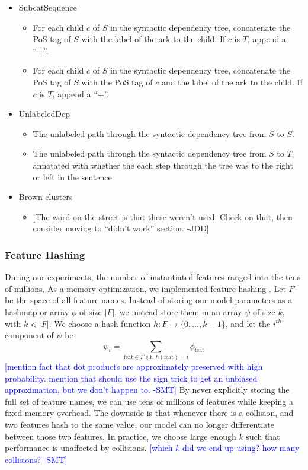 \documentclass[11pt]{article}
\newcommand{\sam}[1]{\textcolor{blue}{[#1 -SMT]}}
\newcommand{\jdcomment}[1]{\textcolor{NavyBlue}{[#1 -JDD]}}
\begin{document}
\begin{itemize}
\item SubcatSequence
\begin{itemize}
\item For each child $c$ of $S$ in the syntactic dependency tree, concatenate the PoS tag of $S$ with the label of the ark to the child. If $c$ is $T$, append a ``+''.
\item For each child $c$ of $S$ in the syntactic dependency tree, concatenate the PoS tag of $S$ with the PoS tag of $c$ and the label of the ark to the child. If $c$ is $T$, append a ``+''.
\end{itemize}
\item UnlabeledDep
\begin{itemize}
\item The unlabeled path through the syntactic dependency tree from $S$ to $S$. 
\item The unlabeled path through the syntactic dependency tree from $S$ to $T$, annotated with whether the each step through the tree was to the right or left in the sentence.
\end{itemize}
\item Brown clusters
\begin{itemize}
\item \jdcomment{The word on the street is that these weren't used. Check on that, then consider moving to ``didn't work'' section.}
\end{itemize}
\end{itemize}

\subsubsection{Feature Hashing}

During our experiments, the number of instantiated features ranged into the tens
of millions.
As a memory optimization, we implemented feature hashing
\cite{weinberger_feature_2009}.
Let $F$ be the space of all feature names.
Instead of storing our model parameters as a hashmap %
or array $\phi$ of size $|F|$, we instead store them in an array $\psi$ of size
$k$, with $k < |F|$.
We choose a hash function $h : F \rightarrow \{0, \ldots, k-1\}$, and
let the $i^{th}$ component of $\psi$ be 
\[
\psi_i = \sum_{\text{feat}\in F \text{ s.t. }
h(\text{feat})=i}{\phi_{\text{feat}}}
\]
\sam{mention fact that dot products are approximately preserved with high
probability.
mention that should use the sign trick to get an unbiased approximation, but
we don't happen to.}
By never explicitly storing the full set of feature names, we can use
tens of millions of features while keeping a fixed memory overhead.
The downside is that whenever there is a collision, and two features hash to the
same value, our model can no longer differentiate between those two features.
In practice, we choose large enough $k$ such that performance is unaffected by
collisions.
\sam{which $k$ did we end up using? how many collisions?}
\end{document}
